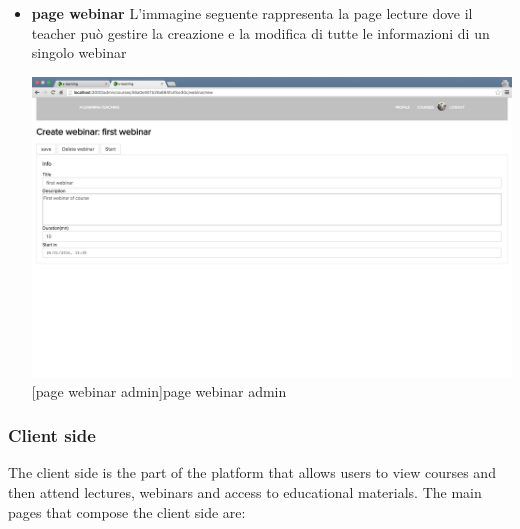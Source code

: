 \begin{itemize}
\item \textbf{page webinar} L'immagine seguente rappresenta la page lecture dove il teacher può gestire la creazione e la modifica di tutte le informazioni di un singolo webinar\par

\begin{minipage}{\linewidth}
    \centering
    \includegraphics[width=1.0\linewidth]{images/chapter4/page-webinar-admin.png}
    [page webinar admin]{page webinar admin}
\end{minipage}

\end{itemize}


\subsubsection {Client side}
\label{subsec:Client_side}
The client side is the part of the platform that allows users to view courses and then attend lectures, webinars and access to educational materials.
The main pages that compose the client side are:

